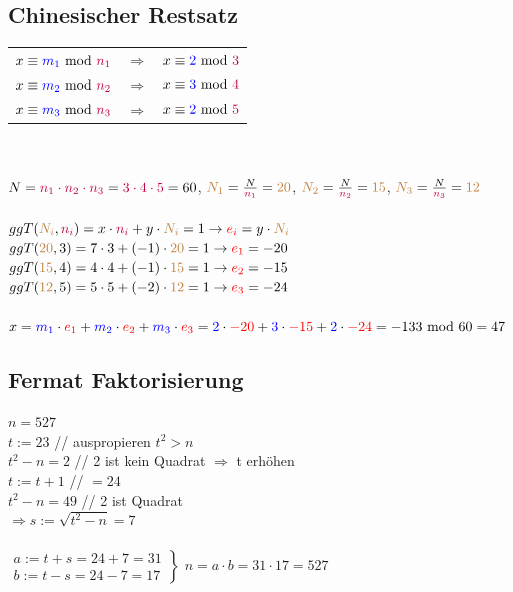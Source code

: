 \documentclass[landscape,twocolumn,a4paper]{article}
\newcommand{\T}[1]{\text{#1}} %
\newcommand{\Ra}{\Rightarrow}
\newcommand{\Brackar}[2]{\left.\begin{array}{#1} #2 \end{array}\right\rbrace} %
\begin{document}
\subsection{Chinesischer Restsatz}
\begin{tabular}{l c l}
 $x\equiv {\color{blue}m_1}\T{ mod }{\color{purple}n_1}$ & $\Ra$ & $x\equiv {\color{blue}2}\T{ mod }{\color{purple}3}$\\
 $x\equiv {\color{blue}m_2}\T{ mod }{\color{purple}n_2}$ & $\Ra$ & $x\equiv {\color{blue}3}\T{ mod }{\color{purple}4}$\\
 $x\equiv {\color{blue}m_3}\T{ mod }{\color{purple}n_3}$ & $\Ra$ & $x\equiv {\color{blue}2}\T{ mod }{\color{purple}5}$\\
\end{tabular}\\ \\
$N={\color{purple}n_1\cdot n_2 \cdot n_3} = {\color{purple}3\cdot4\cdot5}=60$, 
${\color{brown}N_1}=\frac{N}{\color{purple}n_1}={\color{brown}20}$, ${\color{brown}N_2}=\frac{N}{\color{purple}n_2}={\color{brown}15}$, ${\color{brown}N_3}=\frac{N}{\color{purple}n_3}={\color{brown}12}$\\
\\
$ggT({\color{brown}N_i},{\color{purple}n_i})=x\cdot {\color{purple}n_i}+y\cdot {\color{brown}N_i} = 1 \to {\color{red}e_i}=y\cdot {\color{brown}N_i}$ \\
$ggT({\color{brown}20},3)=7\cdot3+(-1)\cdot{\color{brown}20} = 1 \to {\color{red}e_1}=-20$\\
$ggT({\color{brown}15},4)=4\cdot4+(-1)\cdot{\color{brown}15} = 1 \to {\color{red}e_2}=-15$\\
$ggT({\color{brown}12},5)=5\cdot5+(-2)\cdot{\color{brown}12} = 1 \to {\color{red}e_3}=-24$\\
 \\
 $x={\color{blue}m_1}\cdot {\color{red}e_1}+{\color{blue}m_2}\cdot {\color{red}e_2}+{\color{blue}m_3}\cdot {\color{red}e_3}={\color{blue}2}\cdot {\color{red}-20}+{\color{blue}3}\cdot {\color{red}-15}+{\color{blue}2}\cdot {\color{red}-24}=-133\T{ mod }60=47$ 

\subsection{Fermat Faktorisierung}
$n=527$ \\
$t:=23$ \hspace{2cm} {\color{gray} // auspropieren $t^2>n$}\\
$t^2-n=2$ \hspace{2cm} {\color{gray} // 2 ist kein Quadrat $\Ra$ t erhöhen}\\
$t:=t+1$ \hspace{2cm} {\color{gray} // $=24$}\\
$t^2-n=49$ \hspace{2cm} {\color{gray} // 2 ist Quadrat}\\
$\Ra s:= \sqrt{t^2-n}=7$ \\
\\
$\Brackar{l}{a:=t+s = 24+7=31 \\ b:=t-s = 24-7=17}$ $n=a\cdot b = 31 \cdot 17 = 527$
 
\end{document}
